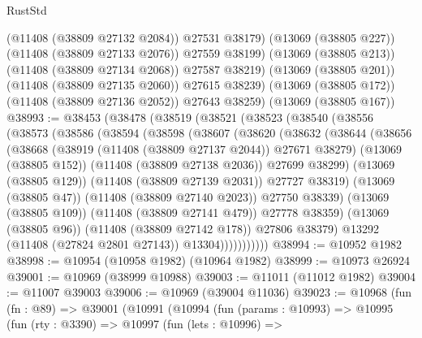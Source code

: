 \begin{lexlean}{RustStd}
\begin{coremodule}
              (@11408 (@38809 @27132 @2084))
              @27531
              @38179)
            (@13069 (@38805 @227))
            (@11408 (@38809 @27133 @2076))
            @27559
            @38199)
          (@13069 (@38805 @213))
          (@11408 (@38809 @27134 @2068))
          @27587
          @38219)
        (@13069 (@38805 @201))
        (@11408 (@38809 @27135 @2060))
        @27615
        @38239)
      (@13069 (@38805 @172))
      (@11408 (@38809 @27136 @2052))
      @27643
      @38259)
    (@13069 (@38805 @167))
@38993 := @38453
    (@38478
      (@38519
        (@38521
          (@38523
            (@38540
              (@38556
                (@38573
                  (@38586
                    (@38594
                      (@38598
                        (@38607
                          (@38620
                            (@38632
                              (@38644
                                (@38656
                                  (@38668
                                    (@38919 (@11408 (@38809 @27137 @2044)) @27671 @38279)
                                    (@13069 (@38805 @152))
                                    (@11408 (@38809 @27138 @2036))
                                    @27699
                                    @38299)
                                  (@13069 (@38805 @129))
                                  (@11408 (@38809 @27139 @2031))
                                  @27727
                                  @38319)
                                (@13069 (@38805 @47))
                                (@11408 (@38809 @27140 @2023))
                                @27750
                                @38339)
                              (@13069 (@38805 @109))
                              (@11408 (@38809 @27141 @479))
                              @27778
                              @38359)
                            (@13069 (@38805 @96))
                            (@11408 (@38809 @27142 @178))
                            @27806
                            @38379)
                          @13292
                          (@11408 (@27824 @2801 @27143))
                          @13304)))))))))))
@38994 := @10952 @1982
@38998 := @10954 (@10958 @1982) (@10964 @1982)
@38999 := @10973 @26924
@39001 := @10969 (@38999 @10988)
@39003 := @11011 (@11012 @1982)
@39004 := @11007 @39003
@39006 := @10969 (@39004 @11036)
@39023 := @10968
    (fun (fn : @89) =>
    @39001
      (@10991
        (@10994
          (fun (params : @10993) =>
          @10995
            (fun (rty : @3390) =>
            @10997
              (fun (lets : @10996) =>

\end{coremodule}
\end{lexlean}
